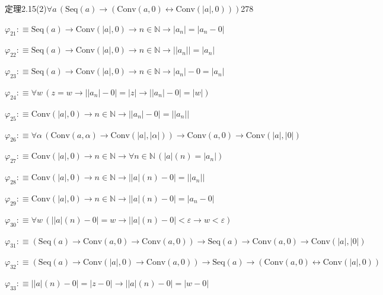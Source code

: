\begin{fullproof}{定理2.15(2)}{$\forall a\,(\mathrm{Seq}(a) \to (\mathrm{Conv}(a,0) \leftrightarrow \mathrm{Conv}(\lvert a \rvert,0)))$}{278}
\begin{abbrevlist}
\item $\varphi_{21} :\equiv \mathrm{Seq}(a) \to \mathrm{Conv}(\lvert a \rvert,0) \to n \in \mathbb{N} \to \lvert a_{n} \rvert = \lvert a_{n} - 0 \rvert$
\item $\varphi_{22} :\equiv \mathrm{Seq}(a) \to \mathrm{Conv}(\lvert a \rvert,0) \to n \in \mathbb{N} \to \lvert \lvert a_{n} \rvert \rvert = \lvert a_{n} \rvert$
\item $\varphi_{23} :\equiv \mathrm{Seq}(a) \to \mathrm{Conv}(\lvert a \rvert,0) \to n \in \mathbb{N} \to \lvert a_{n} \rvert - 0 = \lvert a_{n} \rvert$
\item $\varphi_{24} :\equiv \forall w\,(z = w \to \lvert \lvert a_{n} \rvert - 0 \rvert = \lvert z \rvert \to \lvert \lvert a_{n} \rvert - 0 \rvert = \lvert w \rvert)$
\item $\varphi_{25} :\equiv \mathrm{Conv}(\lvert a \rvert,0) \to n \in \mathbb{N} \to \lvert \lvert a_{n} \rvert - 0 \rvert = \lvert \lvert a_{n} \rvert \rvert$
\item $\varphi_{26} :\equiv \forall \alpha\,(\mathrm{Conv}(a,\alpha) \to \mathrm{Conv}(\lvert a \rvert,\lvert \alpha \rvert)) \to \mathrm{Conv}(a,0) \to \mathrm{Conv}(\lvert a \rvert,\lvert 0 \rvert)$
\item $\varphi_{27} :\equiv \mathrm{Conv}(\lvert a \rvert,0) \to n \in \mathbb{N} \to \forall n \in \mathbb{N}\,(\lvert a \rvert(n) = \lvert a_{n} \rvert)$
\item $\varphi_{28} :\equiv \mathrm{Conv}(\lvert a \rvert,0) \to n \in \mathbb{N} \to \lvert \lvert a \rvert(n) - 0 \rvert = \lvert \lvert a_{n} \rvert \rvert$
\item $\varphi_{29} :\equiv \mathrm{Conv}(\lvert a \rvert,0) \to n \in \mathbb{N} \to \lvert \lvert a \rvert(n) - 0 \rvert = \lvert a_{n} - 0 \rvert$
\item $\varphi_{30} :\equiv \forall w\,(\lvert \lvert a \rvert(n) - 0 \rvert = w \to \lvert \lvert a \rvert(n) - 0 \rvert < \varepsilon \to w < \varepsilon)$
\item $\varphi_{31} :\equiv (\mathrm{Seq}(a) \to \mathrm{Conv}(a,0) \to \mathrm{Conv}(a,0)) \to \mathrm{Seq}(a) \to \mathrm{Conv}(a,0) \to \mathrm{Conv}(\lvert a \rvert,\lvert 0 \rvert)$
\item $\varphi_{32} :\equiv (\mathrm{Seq}(a) \to \mathrm{Conv}(\lvert a \rvert,0) \to \mathrm{Conv}(a,0)) \to \mathrm{Seq}(a) \to (\mathrm{Conv}(a,0) \leftrightarrow \mathrm{Conv}(\lvert a \rvert,0))$
\item $\varphi_{33} :\equiv \lvert \lvert a \rvert(n) - 0 \rvert = \lvert z - 0 \rvert \to \lvert \lvert a \rvert(n) - 0 \rvert = \lvert w - 0 \rvert$

\end{abbrevlist}
\end{fullproof}
